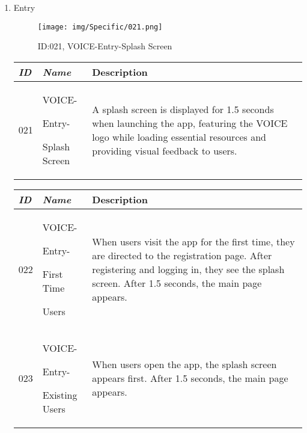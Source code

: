 \documentclass[conference]{IEEEtran}
\begin{document}
\begin{enumerate}[label=\arabic*]
    \item Entry\par
    \vspace{0.3em}

    \begin{figure}[h]
        \centering
        \texttt{[image: img/Specific/021.png]}
        \caption{ID:021, VOICE-Entry-Splash Screen}
    \end{figure}

    \begin{table}[h]
    \def\arraystretch{1.2} \small
        \begin{tabular}{|p{1cm}|p{1.8cm}|p{4.8cm}|}
        \hline
            \textit{\textbf{ID}} & \textit{\textbf{Name}} & {\textbf{Description}} \\
        \hline
            021 \par & VOICE-\par Entry-\par Splash Screen & A splash screen is displayed for 1.5 seconds when launching the app, featuring the VOICE logo while loading essential resources and providing visual feedback to users. \\
        \hline
        \end{tabular}
    \end{table}

    \newpage

    \begin{table}[h]
    \def\arraystretch{1.2} \small
        \begin{tabular}{|p{1cm}|p{1.8cm}|p{4.8cm}|}
        \hline
            \textit{\textbf{ID}} & \textit{\textbf{Name}} & {\textbf{Description}} \\
        \hline
            022 \par & VOICE-\par Entry-\par First Time\par Users & When users visit the app for the first time, they are directed to the registration page. After registering and logging in, they see the splash screen. After 1.5 seconds, the main page appears. \\
        \hline
            023 \par & VOICE-\par Entry-\par Existing Users & When users open the app, the splash screen appears first. After 1.5 seconds, the main page appears. \\
        \hline
        \end{tabular}
    \end{table}


\end{enumerate}
\end{document}
